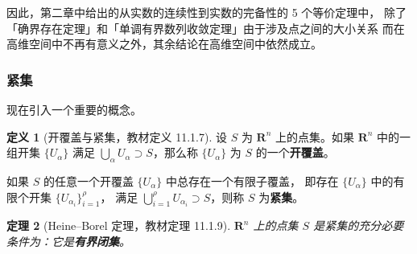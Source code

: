 \documentclass[11pt]{ctexart}
\theoremstyle{plain}
\newtheorem{thm}{定理}[section]
\theoremstyle{definition}
\newtheorem{defn}[thm]{定义}
\theoremstyle{remark}
\begin{document}
因此，第二章中给出的从实数的连续性到实数的完备性的 5 个等价定理中，
除了「确界存在定理」和「单调有界数列收敛定理」由于涉及点之间的大小关系
而在高维空间中不再有意义之外，其余结论在高维空间中依然成立。

\subsubsection{紧集}

现在引入一个重要的概念。

\begin{defn}[开覆盖与紧集，教材定义 11.1.7]\label{def:compact}
设 \(S\) 为 \(\mathbf{R}^n\) 上的点集。如果 \(\mathbf{R}^n\) 中的一组开集
\(\{U_\alpha\}\) 满足 \(\bigcup_\alpha U_\alpha\supset S\)，那么称 \(\{U_\alpha\}\) 为
\(S\) 的一个\textbf{开覆盖}。

如果 \(S\) 的任意一个开覆盖 \(\{U_\alpha\}\) 中总存在一个有限子覆盖，
即存在 \(\{U_\alpha\}\) 中的有限个开集 \(\{U_{\alpha_i}\}_{i=1}^{\rho}\)，
满足 \(\bigcup_{i=1}^{\rho}U_{\alpha_i}\supset S\)，则称 \(S\) 为\textbf{紧集}。
\end{defn}

\begin{thm}[Heine--Borel 定理，教材定理 11.1.9]\label{thm:heineborel}
\(\mathbf{R}^n\) 上的点集 \(S\) 是紧集的充分必要条件为：它是\textbf{有界闭集}。
\end{thm}
\end{document}

